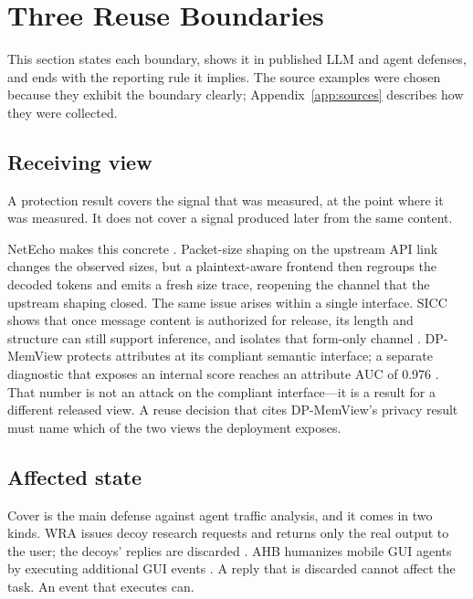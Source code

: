 \section{Three Reuse Boundaries}\label{sec:boundaries}\label{sec:corpus-map}
This section states each boundary, shows it in published LLM and agent defenses, and ends with the reporting rule it implies. The source examples were chosen because they exhibit the boundary clearly; Appendix~\ref{app:sources} describes how they were collected.

\subsection{Receiving view}\label{sec:receiving-view}
A protection result covers the signal that was measured, at the point where it was measured. It does not cover a signal produced later from the same content.

NetEcho makes this concrete \cite{netecho2025}. Packet-size shaping on the upstream API link changes the observed sizes, but a plaintext-aware frontend then regroups the decoded tokens and emits a fresh size trace, reopening the channel that the upstream shaping closed. The same issue arises within a single interface. SICC shows that once message content is authorized for release, its length and structure can still support inference, and isolates that form-only channel \cite[Table~3]{xu2026sicc}. DP-MemView protects attributes at its compliant semantic interface; a separate diagnostic that exposes an internal score reaches an attribute AUC of 0.976 \cite[RQ2]{dpmemview2026}. That number is not an attack on the compliant interface---it is a result for a different released view. A reuse decision that cites DP-MemView's privacy result must name which of the two views the deployment exposes.


\subsection{Affected state}\label{sec:affected-state}
Cover is the main defense against agent traffic analysis, and it comes in two kinds. WRA issues decoy research requests and returns only the real output to the user; the decoys' replies are discarded \cite{jeong2026wra}. AHB humanizes mobile GUI agents by executing additional GUI events \cite{zhu2026turing}. A reply that is discarded cannot affect the task. An event that executes can.

